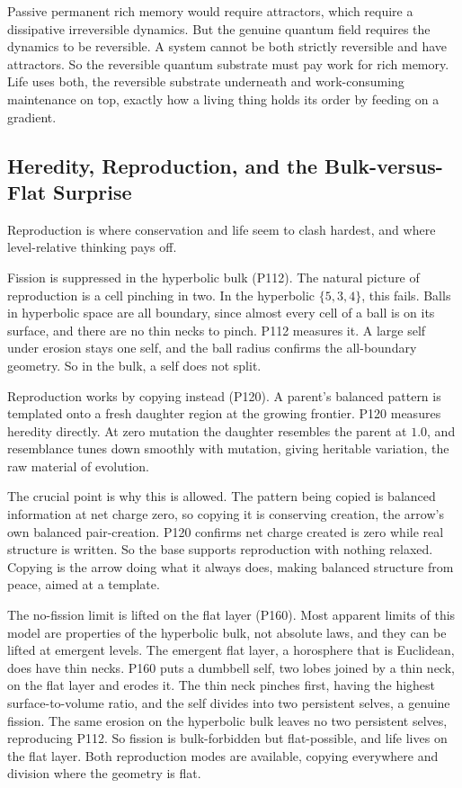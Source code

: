 Passive permanent rich memory would require attractors, which require a dissipative irreversible dynamics. But the genuine quantum field requires the dynamics to be reversible. A system cannot be both strictly reversible and have attractors. So the reversible quantum substrate must pay work for rich memory. Life uses both, the reversible substrate underneath and work-consuming maintenance on top, exactly how a living thing holds its order by feeding on a gradient.

\subsection{Heredity, Reproduction, and the Bulk-versus-Flat Surprise}

Reproduction is where conservation and life seem to clash hardest, and where level-relative thinking pays off.

Fission is suppressed in the hyperbolic bulk (P112). The natural picture of reproduction is a cell pinching in two. In the hyperbolic $\{5,3,4\}$, this fails. Balls in hyperbolic space are all boundary, since almost every cell of a ball is on its surface, and there are no thin necks to pinch. P112 measures it. A large self under erosion stays one self, and the ball radius confirms the all-boundary geometry. So in the bulk, a self does not split.

Reproduction works by copying instead (P120). A parent's balanced pattern is templated onto a fresh daughter region at the growing frontier. P120 measures heredity directly. At zero mutation the daughter resembles the parent at $1.0$, and resemblance tunes down smoothly with mutation, giving heritable variation, the raw material of evolution.

The crucial point is why this is allowed. The pattern being copied is balanced information at net charge zero, so copying it is conserving creation, the arrow's own balanced pair-creation. P120 confirms net charge created is zero while real structure is written. So the base supports reproduction with nothing relaxed. Copying is the arrow doing what it always does, making balanced structure from peace, aimed at a template.

The no-fission limit is lifted on the flat layer (P160). Most apparent limits of this model are properties of the hyperbolic bulk, not absolute laws, and they can be lifted at emergent levels. The emergent flat layer, a horosphere that is Euclidean, does have thin necks. P160 puts a dumbbell self, two lobes joined by a thin neck, on the flat layer and erodes it. The thin neck pinches first, having the highest surface-to-volume ratio, and the self divides into two persistent selves, a genuine fission. The same erosion on the hyperbolic bulk leaves no two persistent selves, reproducing P112. So fission is bulk-forbidden but flat-possible, and life lives on the flat layer. Both reproduction modes are available, copying everywhere and division where the geometry is flat.

